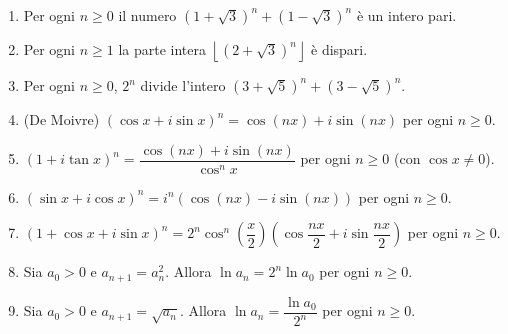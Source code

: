 \documentclass[11pt,a4paper]{article}
\begin{document}
\begin{enumerate}
\item Per ogni $n\ge0$ il numero $\left(1+\sqrt3\right)^n+\left(1-\sqrt3\right)^n$ è un intero pari.
\item Per ogni $n\ge1$ la parte intera $\left\lfloor\left(2+\sqrt3\right)^n\right\rfloor$ è dispari.
\item Per ogni $n\ge0$, $2^n$ divide l'intero $\left(3+\sqrt5\right)^n+\left(3-\sqrt5\right)^n$.
\item (De Moivre) $(\cos x+i\sin x)^n=\cos(nx)+i\sin(nx)$ per ogni $n\ge0$.
\item $(1+i\tan x)^n=\dfrac{\cos(nx)+i\sin(nx)}{\cos^n x}$ per ogni $n\ge0$ (con $\cos x\neq0$).
\item $(\sin x+i\cos x)^n=i^n\left(\cos(nx)-i\sin(nx)\right)$ per ogni $n\ge0$.
\item $(1+\cos x+i\sin x)^n=2^n\cos^n\!\left(\dfrac{x}{2}\right)\left(\cos\dfrac{nx}{2}+i\sin\dfrac{nx}{2}\right)$ per ogni $n\ge0$.
\item Sia $a_0>0$ e $a_{n+1}=a_n^2$. Allora $\ln a_n=2^n\ln a_0$ per ogni $n\ge0$.
\item Sia $a_0>0$ e $a_{n+1}=\sqrt{a_n}$. Allora $\ln a_n=\dfrac{\ln a_0}{2^n}$ per ogni $n\ge0$.
\end{enumerate}
\end{document}
